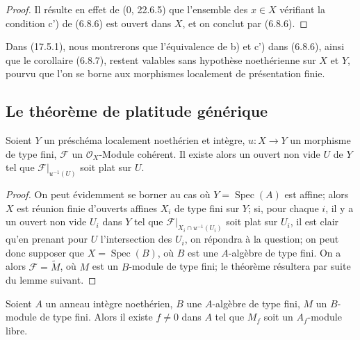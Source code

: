 \begin{proof}
Il résulte en effet de (0, 22.6.5) que l'ensemble des $x\in X$ vérifiant la
condition c') de (6.8.6) est ouvert dans $X$, et on conclut par (6.8.6).
\end{proof}

\begin{remark}[6.8.8]
\label{IV.2.s6.8.8-fr}
Dans (17.5.1), nous montrerons que l'équivalence de b) et c') dans (6.8.6),
ainsi que le corollaire (6.8.7), restent valables sans hypothèse noethérienne
sur $X$ et $Y$, pourvu que l'on se borne aux morphismes localement de
présentation finie.
\end{remark}

\subsection{Le théorème de platitude générique}
\label{subsection:IV.6.9}

\begin{theorem}[6.9.1]
\label{IV.2.s6.9.1-fr}
Soient $Y$ un préschéma localement noethérien et intègre, $u:X\to Y$ un
morphisme de type fini, $\mathcal F$ un $\mathcal O_X$-Module cohérent. Il
existe alors un ouvert non vide $U$ de $Y$ tel que
$\mathcal F|_{u^{-1}(U)}$ soit plat sur $U$.
\end{theorem}

\begin{proof}
On peut évidemment se borner au cas où $Y=\operatorname{Spec}(A)$ est affine;
alors $X$ est réunion finie d'ouverts affines $X_i$ de type fini sur $Y$; si,
pour chaque $i$, il y a un ouvert non vide $U_i$ dans $Y$ tel que
$\mathcal F|_{X_i\cap u^{-1}(U_i)}$ soit plat sur $U_i$, il est clair qu'en
prenant pour $U$ l'intersection des $U_i$, on répondra à la question; on peut
donc supposer que $X=\operatorname{Spec}(B)$, où $B$ est une $A$-algèbre de
type fini. On a alors $\mathcal F=\widetilde M$, où $M$ est un $B$-module de
type fini; le théorème résultera par suite du lemme suivant.
\end{proof}

\begin{lemma}[6.9.2]
\label{IV.2.s6.9.2-fr}
Soient $A$ un anneau intègre noethérien, $B$ une $A$-algèbre de type fini,
$M$ un $B$-module de type fini. Alors il existe $f\ne0$ dans $A$ tel que
$M_f$ soit un $A_f$-module libre.
\end{lemma}

